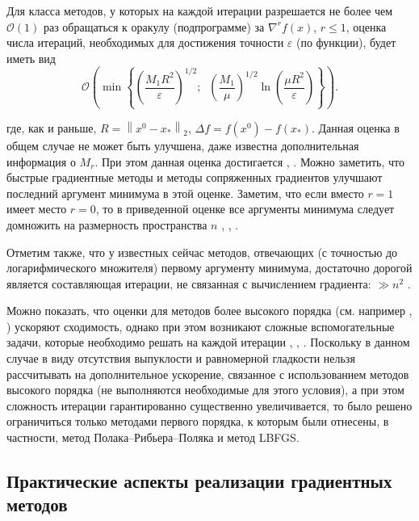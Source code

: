   Для класса методов, у которых на каждой итерации разрешается не более чем $\mathcal{O}\left( 1 \right)$ раз обращаться к оракулу (подпрограмме) за $\nabla ^rf\left( x \right)$, $r\le 1$, оценка числа итераций, необходимых для достижения точности $\varepsilon $ (по функции), будет иметь вид
  \[
    \mathcal{O}\left( {\min \left\{ {\left( {\frac{M_1 
    R^2}{\varepsilon }} \right)^{1/2};\;\;\left( {\frac{M_1 }{\mu }} \right)^{1/2}\ln \left( {\frac{\mu R^2}{\varepsilon }} 
    \right)} \right\}} \right).
  \]

  где, как и раньше, $R=\left\| {x^0-x_\ast } \right\|_2 $, $\Delta f=f\left( {x^0} \right)-f\left( {x_\ast } \right)$. Данная оценка в общем случае не может быть улучшена, даже известна дополнительная информация о $M_r$. \cite{Nemirovski1979} При этом данная оценка достигается \cite{nesterov2013introductory}, \cite{Nemirovski1979}.  Можно заметить, что быстрые градиентные методы и методы сопряженных градиентов улучшают последний аргумент минимума в этой оценке. Заметим, что если вместо $r=1$ имеет место $r=0$, то в приведенной оценке все аргументы минимума следует домножить на размерность пространства $n$ \cite{bayandina2017gradient}, \cite{dvurechensky2018accelerated}, \cite{Protasov1996}.

  Отметим также, что у известных сейчас методов, отвечающих (с точностью до логарифмического множителя) первому аргументу минимума, достаточно дорогой является составляющая итерации, не связанная с вычислением градиента: $\gg n^2$ \cite{lee2015faster}.

  Можно показать, что оценки для методов более высокого порядка (см. например \cite{nesterov2018implementable}, \cite{arjevani2017oracle}) ускоряют сходимость, однако при этом возникают сложные вспомогательные задачи, которые необходимо решать на каждой итерации \cite{gasnikov2018global}, \cite{nesterov2018implementable}, \cite{monteiro2013accelerated}. Поскольку в данном случае в виду отсутствия выпуклости и равномерной гладкости нельзя рассчитывать на дополнительное ускорение, связанное с использованием методов высокого порядка (не выполняются необходимые для этого условия), а при этом сложность итерации гарантированно существенно увеличивается, то было решено ограничиться только методами первого порядка, к которым были отнесены, в частности, метод Полака--Рибьера--Поляка и метод LBFGS.


\subsection{Практические аспекты реализации градиентных методов}

